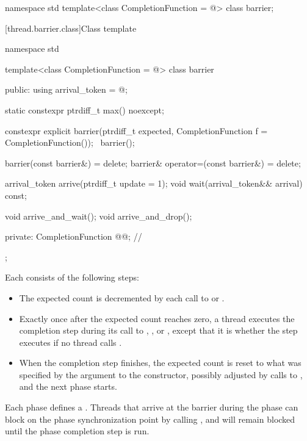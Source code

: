 %
\begin{codeblock}
namespace std {
  template<class CompletionFunction = @\seebelow@>
    class barrier;
}
\end{codeblock}

[thread.barrier.class]{Class template }

\begin{codeblock}
namespace std {
  template<class CompletionFunction = @\seebelow@>
  class barrier {
  public:
    using arrival_token = @\seebelow@;

    static constexpr ptrdiff_t max() noexcept;

    constexpr explicit barrier(ptrdiff_t expected,
                               CompletionFunction f = CompletionFunction());
    ~barrier();

    barrier(const barrier&) = delete;
    barrier& operator=(const barrier&) = delete;

    arrival_token arrive(ptrdiff_t update = 1);
    void wait(arrival_token&& arrival) const;

    void arrive_and_wait();
    void arrive_and_drop();

  private:
    CompletionFunction @@;      // \expos
  };
}
\end{codeblock}

\pnum
Each  consists of the following steps:
\begin{itemize}
\item
  The expected count is decremented
  by each call to  or .
\item
  Exactly once after the expected count reaches zero, a thread
  executes the completion step during its call
  to , , or ,
  except that it is 
  whether the step executes if no thread calls .
\item
  When the completion step finishes,
  the expected count is reset
  to what was specified by the  argument to the constructor,
  possibly adjusted by calls to , and
  the next phase starts.
\end{itemize}

%
\pnum
{}%
Each phase defines a .
Threads that arrive at the barrier during the phase
can block on the phase synchronization point by calling , and
will remain blocked until the phase completion step is run.

